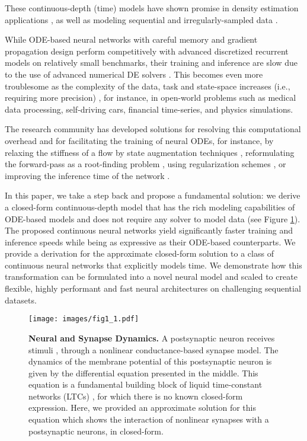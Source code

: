 \documentclass[12pt]{article}
\begin{document}
These continuous-depth (time) models have shown promise in density estimation applications \cite{grathwohl2018ffjord,dupont2019augmented,yang2019pointflow,liebenwein2021sparse}, as well as modeling sequential and irregularly-sampled data \cite{rubanova2019latent,gholami2019anode,lechner2020learning,hasani2021liquid}. 

While ODE-based neural networks with careful memory and gradient propagation design \cite{lechner2020learning} perform competitively with advanced discretized recurrent models on relatively small benchmarks, their training and inference are slow due to the use  of advanced numerical DE solvers \cite{prince1981high}. This becomes even more troublesome as the complexity of the data, task and state-space increases (i.e., requiring more precision) \cite{raissi2019physics}, for instance, in open-world problems such as medical data processing, self-driving cars, financial time-series, and physics simulations.

The research community has developed solutions for resolving this computational overhead and for facilitating the training of neural ODEs, for instance, by relaxing the stiffness of a flow by state augmentation techniques \cite{dupont2019augmented,massaroli2020dissecting}, reformulating the forward-pass as a root-finding problem \cite{bai2019deep}, using regularization schemes \cite{finlay2020train,massaroli2020stable,kidger2020hey}, or improving the inference time of the network \cite{poli2020hypersolvers}.

In this paper, we take a step back and propose a fundamental solution: we derive a closed-form continuous-depth model that has the rich modeling capabilities of ODE-based models and does not require any solver to model data (see Figure \ref{fig:neural_representation}). The proposed continuous neural networks yield significantly faster training and inference speeds while being as expressive as their ODE-based counterparts. We provide a derivation for the approximate closed-form solution to a class of continuous neural networks that explicitly models time. We demonstrate how this transformation can be formulated into a novel neural model and scaled to create flexible, highly performant and fast neural architectures on challenging sequential datasets.

\begin{figure}[t]
	\centering
	\texttt{[image: images/fig1\_1.pdf]}
	\caption{\textbf{Neural and Synapse Dynamics.} A postsynaptic neuron receives stimuli , through a nonlinear conductance-based synapse model. The dynamics of the membrane potential of this postsynaptic neuron is given by the differential equation presented in the middle. This equation is a fundamental building block of liquid time-constant networks (LTCs) \cite{hasani2021liquid}, for which there is no known closed-form expression. Here, we provided an approximate solution for this equation which shows the interaction of nonlinear synapses with a postsynaptic neurons, in closed-form.}
	\label{fig:neural_representation}
\end{figure}
\end{document}

